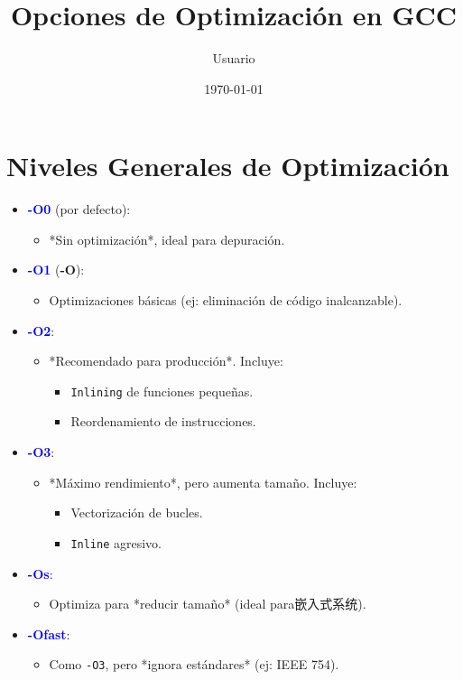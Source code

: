 \documentclass{article}
\title{Opciones de Optimización en GCC}
\author{Usuario}
\date{\today}
\begin{document}
\maketitle

\section{Niveles Generales de Optimización}
\begin{itemize}
    \item \textbf{\textcolor{blue}{-O0}} (por defecto):  
    \begin{itemize}
        \item *Sin optimización*, ideal para depuración.
    \end{itemize}
    
    \item \textbf{\textcolor{blue}{-O1}} (\textbf{-O}):  
    \begin{itemize}
        \item Optimizaciones básicas (ej: eliminación de código inalcanzable).
    \end{itemize}
    
    \item \textbf{\textcolor{blue}{-O2}}:  
    \begin{itemize}
        \item *Recomendado para producción*. Incluye:
        \begin{itemize}
            \item \texttt{Inlining} de funciones pequeñas.
            \item Reordenamiento de instrucciones.
        \end{itemize}
    \end{itemize}
    
    \item \textbf{\textcolor{blue}{-O3}}:  
    \begin{itemize}
        \item *Máximo rendimiento*, pero aumenta tamaño. Incluye:
        \begin{itemize}
            \item Vectorización de bucles.
            \item \texttt{Inline} agresivo.
        \end{itemize}
    \end{itemize}
    
    \item \textbf{\textcolor{blue}{-Os}}:  
    \begin{itemize}
        \item Optimiza para *reducir tamaño* (ideal para嵌入式系统).
    \end{itemize}
    
    \item \textbf{\textcolor{blue}{-Ofast}}:  
    \begin{itemize}
        \item Como \texttt{-O3}, pero *ignora estándares* (ej: IEEE 754).
    \end{itemize}
\end{itemize}
\end{document}
